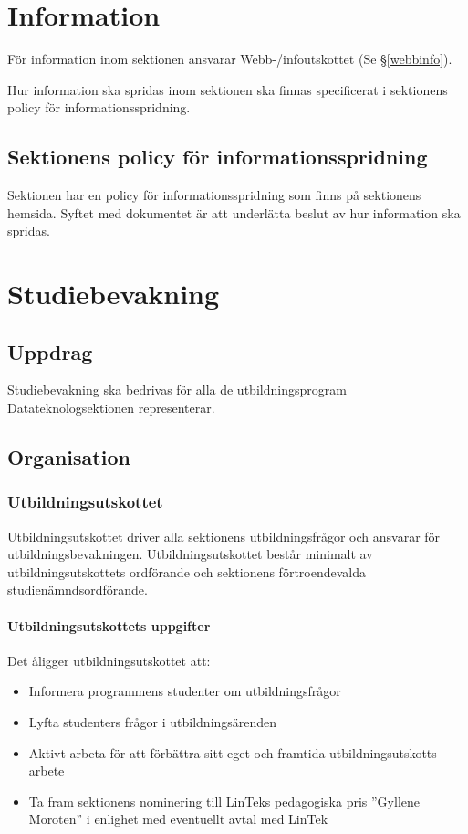 \documentclass{datateknologsektionen-document}
\begin{document}
\section{Information}
För information inom sektionen ansvarar Webb-/infoutskottet (Se \S \ref{webbinfo}).

Hur information ska spridas inom sektionen ska finnas specificerat i sektionens policy för
informationsspridning.
\subsection{Sektionens policy för informationsspridning}
Sektionen har en policy för informationsspridning som finns på sektionens hemsida. Syftet med
dokumentet är att underlätta beslut av hur information ska spridas.
\section{Studiebevakning}
\subsection{Uppdrag}
Studiebevakning ska bedrivas för alla de utbildningsprogram Datateknologsektionen representerar.
\subsection{Organisation}
\subsubsection{Utbildningsutskottet}
\label{utbu}
Utbildningsutskottet driver alla sektionens utbildningsfrågor och ansvarar för
utbildningsbevakningen. Utbildningsutskottet består minimalt av utbildningsutskottets
ordförande och sektionens förtroendevalda studienämndsordförande.
\paragraph{Utbildningsutskottets uppgifter}
Det åligger utbildningsutskottet att:
\begin{itemize}
  \item Informera programmens studenter om utbildningsfrågor
  \item Lyfta studenters frågor i utbildningsärenden
  \item Aktivt arbeta för att förbättra sitt eget och framtida utbildningsutskotts arbete
  \item Ta fram sektionens nominering till LinTeks pedagogiska pris ”Gyllene Moroten” i enlighet med eventuellt avtal med LinTek
\end{itemize}
\end{document}
